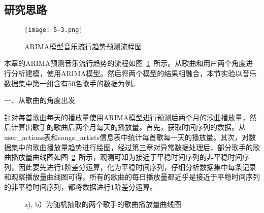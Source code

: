 \subsection{研究思路}
\begin{figure}[htb]
    \centering
\texttt{[image: 5-3.png]}
\caption{ARIMA模型音乐流行趋势预测流程图}
\label{fig:5-3}
\end{figure}
本章的ARIMA预测音乐流行趋势的流程如图~\ref{fig:5-3}~所示。从歌曲和用户两个角度进行分析建模，使用ARIMA模型。然后将两个模型的结果相融合，本节实验以音乐数据集中第一组含有50名歌手的数据为例。

一、从歌曲的角度出发

针对每首歌曲每天的播放量使用ARIMA模型进行预测后两个月的歌曲播放量，然后计算出歌手的歌曲后两个月每天的播放量。首先，获取时间序列的数据。从user\_actions表和songs\_artists信息表中统计每首歌每一天的播放量。其次，对数据集中的歌曲播放量趋势进行绘图，经过第三章对异常数据处理后，部分歌手的歌曲播放量曲线图如图~\ref{fig:5-4}~所示，观测可知为接近于平稳时间序列的非平稳时间序列，因此要先进行1阶差分运算，化为平稳时间序列，仔细分析数据集中每条记录和观察播放量曲线图可得，所有的歌曲的每日播放量都近乎是接近于平稳时间序列的非平稳时间序列，都将数据进行1阶差分运算。
 

\begin{figure}[htb]
     \centering    
    \caption{a), b）为随机抽取的两个歌手的歌曲播放量曲线图 }     
    \label{fig:5-4}     
\end{figure}

